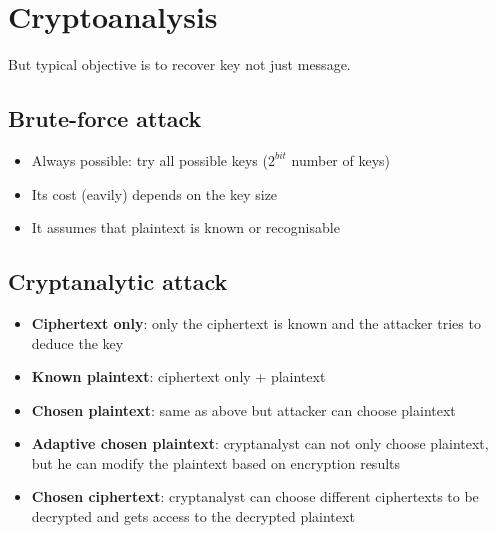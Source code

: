\documentclass[12pt, a4paper]{report}
\begin{document}
\section{Cryptoanalysis}
But typical objective is to recover key not just message.
\subsection{Brute-force attack}
\begin{itemize}
    \item Always possible: try all possible keys ($2^{bit}$ number of keys)
    \item Its cost (eavily) depends on the key size
    \item It assumes that plaintext is known or recognisable
\end{itemize}
\subsection{Cryptanalytic attack}
\begin{itemize}
    \item \textbf{Ciphertext only}: only the ciphertext is known and the attacker tries to deduce the key
    \item \textbf{Known plaintext}: ciphertext only + plaintext
    \item \textbf{Chosen plaintext}: same as above but attacker can choose plaintext
    \item \textbf{Adaptive chosen plaintext}: cryptanalyst can not only choose plaintext, but he can modify the plaintext based on encryption results
    \item \textbf{Chosen ciphertext}: cryptanalyst can choose different ciphertexts to be decrypted and gets access to the decrypted plaintext
\end{itemize}
\end{document}
